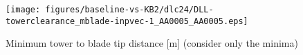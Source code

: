 \begin{figure}[!ht]
\begin{center}
	\texttt{[image: figures/baseline-vs-KB2/dlc24/DLL-towerclearance\_mblade-inpvec-1\_AA0005\_AA0005.eps]}
\end{center}
\caption{Minimum tower to blade tip distance [m] (consider only the minima)}
\label{fig:baseline-vs-KB2:dlc24:tower-tip-clearance}
\end{figure}

